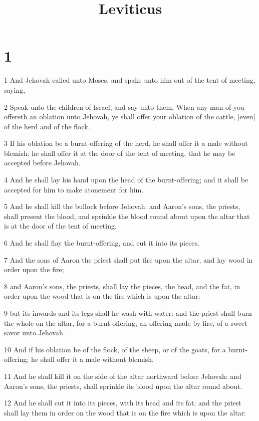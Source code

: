 

\title{Leviticus}

\chapter{1}

\par 1 And Jehovah called unto Moses, and spake unto him out of the tent of meeting, saying,
\par 2 Speak unto the children of Israel, and say unto them, When any man of you offereth an oblation unto Jehovah, ye shall offer your oblation of the cattle, [even] of the herd and of the flock.
\par 3 If his oblation be a burnt-offering of the herd, he shall offer it a male without blemish: he shall offer it at the door of the tent of meeting, that he may be accepted before Jehovah.
\par 4 And he shall lay his hand upon the head of the burnt-offering; and it shall be accepted for him to make atonement for him.
\par 5 And he shall kill the bullock before Jehovah: and Aaron's sons, the priests, shall present the blood, and sprinkle the blood round about upon the altar that is at the door of the tent of meeting.
\par 6 And he shall flay the burnt-offering, and cut it into its pieces.
\par 7 And the sons of Aaron the priest shall put fire upon the altar, and lay wood in order upon the fire;
\par 8 and Aaron's sons, the priests, shall lay the pieces, the head, and the fat, in order upon the wood that is on the fire which is upon the altar:
\par 9 but its inwards and its legs shall he wash with water: and the priest shall burn the whole on the altar, for a burnt-offering, an offering made by fire, of a sweet savor unto Jehovah.
\par 10 And if his oblation be of the flock, of the sheep, or of the goats, for a burnt-offering; he shall offer it a male without blemish.
\par 11 And he shall kill it on the side of the altar northward before Jehovah: and Aaron's sons, the priests, shall sprinkle its blood upon the altar round about.
\par 12 And he shall cut it into its pieces, with its head and its fat; and the priest shall lay them in order on the wood that is on the fire which is upon the altar:
